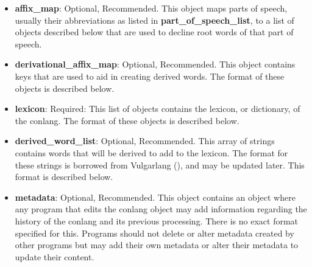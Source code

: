 \begin{itemize}
	\item \textbf{affix\_map}: Optional, Recommended. This object maps parts of speech, usually their abbreviations as listed in \textbf{part\_of\_speech\_list}, to a list of objects described below that are used to decline root words of that part of speech.
	\item \textbf{derivational\_affix\_map}: Optional, Recommended. This object contains keys that are used to aid in creating derived words.  The format of these objects is described below.
	\item \textbf{lexicon}: Required: This list of objects contains the lexicon, or dictionary, of the conlang.  The format of these objects is described below.
	\item \textbf{derived\_word\_list}: Optional, Recommended.  This array of strings contains words that will be derived to add to the lexicon.  The format for these strings is borrowed from Vulgarlang (\cite{camfromvulgarlangVulgarlangFantasyLanguage}), and may be updated later.  This format is described below.
	\item \textbf{metadata}: Optional, Recommended. This object contains an object where any program that edits the conlang object may add information regarding the history of the conlang and its previous processing.  There is no exact format specified for this.  Programs should not delete or alter metadata created by other programs but may add their own metadata or alter their metadata to update their content.  
\end{itemize}

